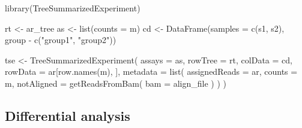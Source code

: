 \documentclass[12pt,twoside]{reedthesis}
\newenvironment{Shaded}{\begin{snugshade}}{\end{snugshade}}
\newcommand{\AttributeTok}[1]{\textcolor[rgb]{0.77,0.63,0.00}{#1}}
\newcommand{\FunctionTok}[1]{\textcolor[rgb]{0.00,0.00,0.00}{#1}}
\newcommand{\NormalTok}[1]{#1}
\newcommand{\OtherTok}[1]{\textcolor[rgb]{0.56,0.35,0.01}{#1}}
\newcommand{\SpecialCharTok}[1]{\textcolor[rgb]{0.00,0.00,0.00}{#1}}
\newcommand{\StringTok}[1]{\textcolor[rgb]{0.31,0.60,0.02}{#1}}
\begin{document}
\begin{Shaded}
\begin{Highlighting}[]
\FunctionTok{library}\NormalTok{(TreeSummarizedExperiment)}

\NormalTok{rt }\OtherTok{\textless{}{-}}\NormalTok{ ar\_tree}
\NormalTok{as }\OtherTok{\textless{}{-}} \FunctionTok{list}\NormalTok{(}\AttributeTok{counts =}\NormalTok{ m)}
\NormalTok{cd }\OtherTok{\textless{}{-}} \FunctionTok{DataFrame}\NormalTok{(}\AttributeTok{samples =} \FunctionTok{c}\NormalTok{(s1, s2), group }\SpecialCharTok{{-}} \FunctionTok{c}\NormalTok{(}\StringTok{"group1"}\NormalTok{, }\StringTok{"group2"}\NormalTok{))}

\NormalTok{tse }\OtherTok{\textless{}{-}} \FunctionTok{TreeSummarizedExperiment}\NormalTok{(}
  \AttributeTok{assays =}\NormalTok{ as,}
  \AttributeTok{rowTree =}\NormalTok{ rt,}
  \AttributeTok{colData =}\NormalTok{ cd,}
  \AttributeTok{rowData =}\NormalTok{ ar[}\FunctionTok{row.names}\NormalTok{(m), ],}
  \AttributeTok{metadata =} \FunctionTok{list}\NormalTok{(}
    \AttributeTok{assignedReads =}\NormalTok{ ar,}
    \AttributeTok{counts =}\NormalTok{ m,}
    \AttributeTok{notAligned =} \FunctionTok{getReadsFromBam}\NormalTok{(}
      \AttributeTok{bam =}\NormalTok{ align\_file}
\NormalTok{    )}
\NormalTok{  )}
\NormalTok{)}
\end{Highlighting}
\end{Shaded}
\hypertarget{differential-analysis-1}{%
\subsection*{Differential analysis}\label{differential-analysis-1}}
\end{document}
